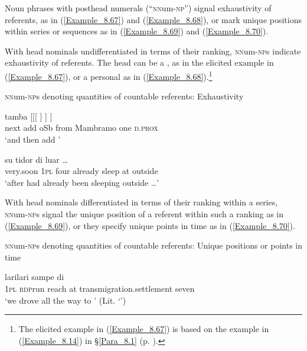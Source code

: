 Noun phrases with posthead numerals (``\textsc{nn}um\textsc{{}-np}'') signal exhaustivity of  referents, as in (\ref{Example_8.67}) and (\ref{Example_8.68}), or mark unique positions within series or sequences as in (\ref{Example_8.69}) and (\ref{Example_8.70}).



With head nominals undifferentiated in terms of their ranking, \textsc{nn}um\textsc{{}-np}s indicate exhaustivity of  referents. The head can be a , as in the elicited example in (\ref{Example_8.67}), or a personal  as in (\ref{Example_8.68}).\footnote{The elicited example in (\ref{Example_8.67}) is based on the example in (\ref{Example_8.14}) in §\ref{Para_8.1} (p. \pageref{Example_8.14}).}



\begin{styleExampleTitle}
\textsc{nn}um\textsc{{}-np}s denoting  quantities of countable referents: Exhaustivity
\end{styleExampleTitle}
\ea
\label{Example_8.67}
 {tamba} {[[[} {} {]} {]} {]}\\ %
 next  add  oSb  from  Mambramo  one  \textsc{d.prox}\\
 ‘and then add ’ \textstyleExampleSource{[Elicited BR111018.004]}
\z

\ea
\label{Example_8.68}
 {} {} {su} {tidor} {di} {luar} {\ldots}\\ %
 very.soon  \textsc{1pl}  four  already  sleep  at  outside  \\
\glt 
‘after  had already been sleeping outside {\ldots}’ \textstyleExampleSource{[081025-009a-Cv.0004]}
\z



With head nominals differentiated in terms of their ranking within a series, \textsc{nn}um\textsc{{}-np}s signal the unique position of a referent within such a ranking as in (\ref{Example_8.69}), or they specify unique points in time as in (\ref{Example_8.70}).



\begin{styleExampleTitle}
\textsc{nn}um\textsc{{}-np}s denoting  quantities of countable referents: Unique positions or points in time
\end{styleExampleTitle}
\ea
\label{Example_8.69}
 {lari{\Tilde}lari} {sampe} {di} {} {}\\ %
 \textsc{1pl}  \textsc{rdp}{\Tilde}run  reach  at  transmigration.settlement  seven\\
\glt 
‘we drove all the way to ’ (Lit. ‘’) \textstyleExampleSource{[081006-033-Cv.0007]}
\z

